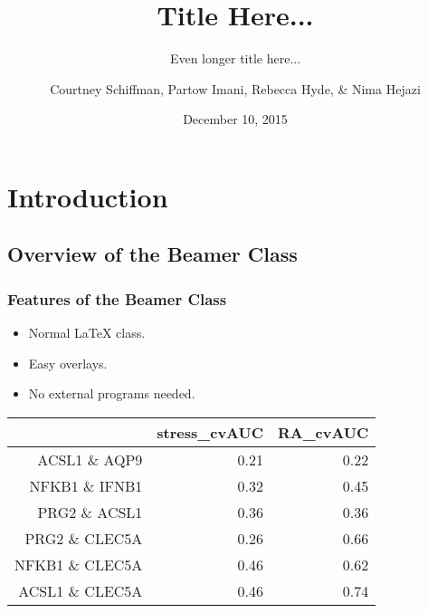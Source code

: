 \documentclass{beamer}
\title{Title Here...}
\subtitle{Even longer title here...}
\author{Courtney Schiffman, Partow Imani, Rebecca Hyde, \& Nima Hejazi}
\institute[UC Berkeley]{University of California, Berkeley}
\date{December 10, 2015}
\begin{document}
\frame{\titlepage}

\section[Outline]{}
\frame{\tableofcontents}

\section{Introduction}
\subsection{Overview of the Beamer Class}
\frame
{
  \frametitle{Features of the Beamer Class}

  \begin{itemize}
  \item<1-> Normal LaTeX class.
  \item<2-> Easy overlays.
  \item<3-> No external programs needed.      
  \end{itemize}

  \begin{table}[ht]
  \centering
  \begin{tabular}{rrr}
   \hline
   & stress\_cvAUC & RA\_cvAUC \\ 
   \hline
ACSL1 \& AQP9 & 0.21 & 0.22 \\ 
  NFKB1 \& IFNB1 & 0.32 & 0.45 \\ 
  PRG2 \& ACSL1 & 0.36 & 0.36 \\ 
  PRG2 \& CLEC5A & 0.26 & 0.66 \\ 
  NFKB1 \& CLEC5A & 0.46 & 0.62 \\ 
  ACSL1 \& CLEC5A & 0.46 & 0.74 \\ 
   \hline
\end{tabular}
\end{table}
}
\end{document}
